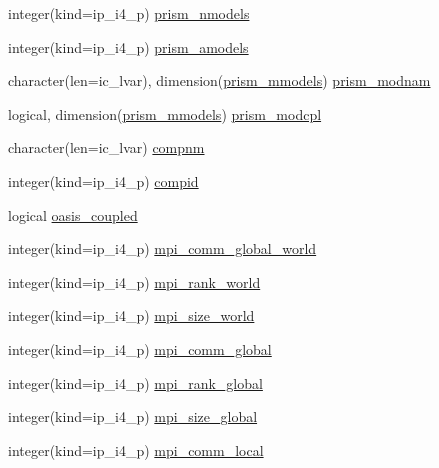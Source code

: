 \begin{DoxyCompactItemize}
\item 
integer(kind=ip\+\_\+i4\+\_\+p) \hyperlink{namespacemod__oasis__data_a5915b02f461626d5a6cffbf037daa75e}{prism\+\_\+nmodels}
\item 
integer(kind=ip\+\_\+i4\+\_\+p) \hyperlink{namespacemod__oasis__data_ac73f95bc17215d09b67c6c4d3adc07b7}{prism\+\_\+amodels}
\item 
character(len=ic\+\_\+lvar), dimension(\hyperlink{namespacemod__oasis__data_a11c61975c048981f7e508f1b6caf16b6}{prism\+\_\+mmodels}) \hyperlink{namespacemod__oasis__data_abd4b98e9f321bc073d5a8e0292ba7131}{prism\+\_\+modnam}
\item 
logical, dimension(\hyperlink{namespacemod__oasis__data_a11c61975c048981f7e508f1b6caf16b6}{prism\+\_\+mmodels}) \hyperlink{namespacemod__oasis__data_ad5282716e60cbe5e8c1ced7758fc9ae1}{prism\+\_\+modcpl}
\item 
character(len=ic\+\_\+lvar) \hyperlink{namespacemod__oasis__data_a8379835615758ccf7a4287dde5785681}{compnm}
\item 
integer(kind=ip\+\_\+i4\+\_\+p) \hyperlink{namespacemod__oasis__data_ab53c9f7676f84fdf1050cea5efcd3e7f}{compid}
\item 
logical \hyperlink{namespacemod__oasis__data_a5056590b195dc981725173c79e52de3b}{oasis\+\_\+coupled}
\item 
integer(kind=ip\+\_\+i4\+\_\+p) \hyperlink{namespacemod__oasis__data_ade1a6490bdec114ed8e10eb47b2bdfe9}{mpi\+\_\+comm\+\_\+global\+\_\+world}
\item 
integer(kind=ip\+\_\+i4\+\_\+p) \hyperlink{namespacemod__oasis__data_abcd9856ba23114a6dc7b823958aa43cb}{mpi\+\_\+rank\+\_\+world}
\item 
integer(kind=ip\+\_\+i4\+\_\+p) \hyperlink{namespacemod__oasis__data_acec56337253693d37772a3a0054826e2}{mpi\+\_\+size\+\_\+world}
\item 
integer(kind=ip\+\_\+i4\+\_\+p) \hyperlink{namespacemod__oasis__data_a4bbff51054fd1746849de9defb3d5252}{mpi\+\_\+comm\+\_\+global}
\item 
integer(kind=ip\+\_\+i4\+\_\+p) \hyperlink{namespacemod__oasis__data_af9bb2a4f321e7d7750e90c01022828fe}{mpi\+\_\+rank\+\_\+global}
\item 
integer(kind=ip\+\_\+i4\+\_\+p) \hyperlink{namespacemod__oasis__data_a83a9d498c6829e2058675a07446ce5be}{mpi\+\_\+size\+\_\+global}
\item 
integer(kind=ip\+\_\+i4\+\_\+p) \hyperlink{namespacemod__oasis__data_acd8801d4fab87a19c6f4f69a661d56c5}{mpi\+\_\+comm\+\_\+local}
\item 

\end{DoxyCompactItemize}
